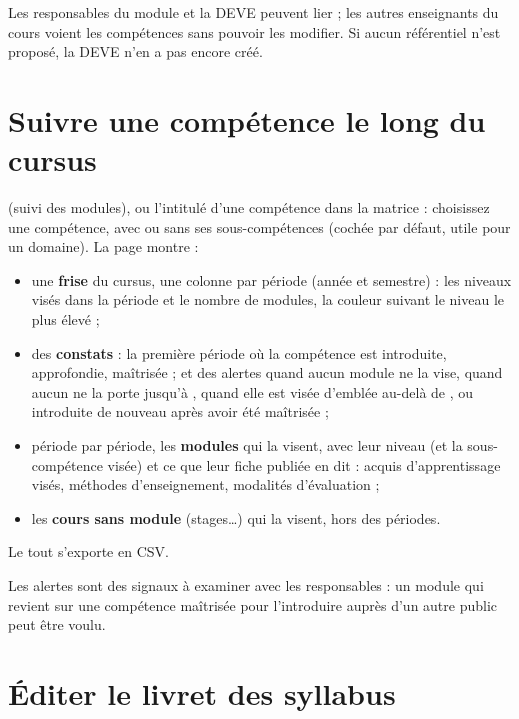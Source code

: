 \documentclass[11pt,a4paper]{article}
\begin{document}

Les responsables du module et la DEVE peuvent lier ; les autres enseignants du cours voient
les compétences sans pouvoir les modifier. Si aucun référentiel n'est proposé, la DEVE n'en a
pas encore créé.

\section{Suivre une compétence le long du cursus}\label{sec:progression}

 (suivi des modules), ou l'intitulé d'une compétence dans
la matrice : choisissez une compétence, avec ou sans ses sous-compétences (cochée par défaut,
utile pour un domaine). La page montre :
\begin{itemize}
  \item une \textbf{frise} du cursus, une colonne par période (année et semestre) : les niveaux
    visés dans la période et le nombre de modules, la couleur suivant le niveau le plus élevé ;
  \item des \textbf{constats} : la première période où la compétence est introduite,
    approfondie, maîtrisée ; et des alertes quand aucun module ne la vise, quand aucun ne la
    porte jusqu'à , quand elle est visée d'emblée au-delà de
    , ou introduite de nouveau après avoir été maîtrisée ;
  \item période par période, les \textbf{modules} qui la visent, avec leur niveau (et la
    sous-compétence visée) et ce que leur fiche publiée en dit : acquis d'apprentissage visés,
    méthodes d'enseignement, modalités d'évaluation ;
  \item les \textbf{cours sans module} (stages\dots) qui la visent, hors des périodes.
\end{itemize}
Le tout s'exporte en CSV.


Les alertes sont des signaux à examiner avec les responsables : un module qui revient sur une
compétence maîtrisée pour l'introduire auprès d'un autre public peut être voulu.

\section{Éditer le livret des syllabus}\label{sec:livret}
\end{document}
